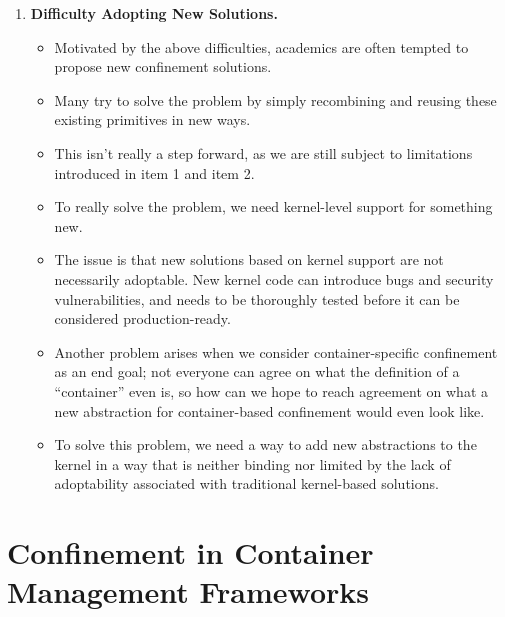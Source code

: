 \begin{enumerate}
  \item \textbf{Difficulty Adopting New Solutions.}
  \begin{inprogress}
    \begin{itemize}
      \item Motivated by the above difficulties, academics are often tempted to propose new confinement solutions.
      \item Many try to solve the problem by simply recombining and reusing these existing primitives in new ways.
      \item This isn't really a step forward, as we are still subject to limitations introduced in item 1 and item 2.
      \item To really solve the problem, we need kernel-level support for something new.
      \item The issue is that new solutions based on kernel support are not necessarily
            adoptable. New kernel code can introduce bugs and security vulnerabilities, and
            needs to be thoroughly tested before it can be considered production-ready.
      \item Another problem arises when we consider container-specific confinement as an
            end goal; not everyone can agree on what the definition of a \enquote{container}
            even is, so how can we hope to reach agreement on what a new abstraction for
            container-based confinement would even look like.
      \item To solve this problem, we need a way to add new abstractions to the kernel in
            a way that is neither binding nor limited by the lack of adoptability associated
            with traditional kernel-based solutions.
    \end{itemize}
  \end{inprogress}
\end{enumerate}




\section{Confinement in Container Management Frameworks}%
\label{s:cp-containers}

